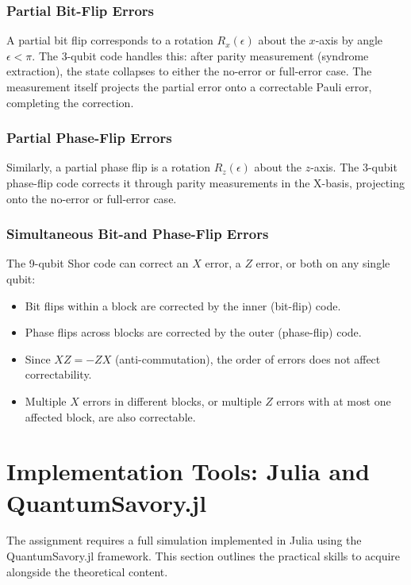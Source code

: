 \documentclass[10pt,a4paper]{article}
\begin{document}
\subsubsection*{Partial Bit-Flip Errors}

A partial bit flip corresponds to a rotation $R_x(\epsilon)$ about the $x$-axis by angle $\epsilon<\pi$. The 3-qubit code handles this: after parity measurement (syndrome extraction), the state collapses to either the no-error or full-error case. The measurement itself projects the partial error onto a correctable Pauli error, completing the correction.

\subsubsection*{Partial Phase-Flip Errors}

Similarly, a partial phase flip is a rotation $R_z(\epsilon)$ about the $z$-axis. The 3-qubit phase-flip code corrects it through parity measurements in the X-basis, projecting onto the no-error or full-error case.

\subsubsection*{Simultaneous Bit-and Phase-Flip Errors}

The 9-qubit Shor code can correct an $X$ error, a $Z$ error, or both on any single qubit:
\begin{itemize}[nosep]
\item Bit flips within a block are corrected by the inner (bit-flip) code.
\item Phase flips across blocks are corrected by the outer (phase-flip) code.
\item Since $XZ=-ZX$ (anti-commutation), the order of errors does not affect correctability.
\item Multiple $X$ errors in different blocks, or multiple $Z$ errors with at most one affected block, are also correctable.
\end{itemize}

\section{Implementation Tools: Julia and QuantumSavory.jl}

The assignment requires a full simulation implemented in Julia using the QuantumSavory.jl framework. This section outlines the practical skills to acquire alongside the theoretical content.
\end{document}

